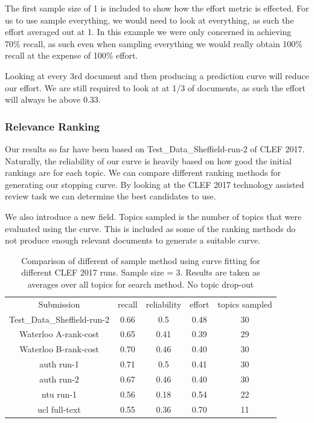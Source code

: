The first sample size of 1 is included to show how the effort metric is effected. For us to use sample everything, we would need to look at everything, as such the effort averaged out at 1. In this example we were only concerned in achieving 70\% recall, as such even when sampling everything we would really obtain 100\% recall at the expense of 100\% effort.

Looking at every 3rd document and then producing a prediction curve will reduce our effort. We are still required to look at at 1/3 of documents, as such the effort will always be above 0.33. 

\subsubsection{Relevance Ranking}

Our results so far have been based on Test\_Data\_Sheffield-run-2 \cite{Alharbi2017} of CLEF 2017. Naturally, the reliability of our curve is heavily based on how good the initial rankings are for each topic. We can compare different ranking methods for generating our stopping curve. By looking at the CLEF 2017 technology assisted review task \cite{Kanoulas12017} we can determine the best candidates to use.

We also introduce a new field. Topics sampled is the number of topics that were evaluated using the curve. This is included as some of the ranking methods do not produce enough relevant documents to generate a suitable curve. 

\begin{table}[H]
\centering
\begin{tabular}{|c|c|c|c|c|} 

 \hline
 Submission & recall & reliability & effort & topics sampled  \\ 
 Test\_Data\_Sheffield-run-2 & 0.66 &	0.5	&	0.48 & 30 \\ 
 Waterloo A-rank-cost & 0.65 & 0.41	&	0.39 & 29 \\ 
 Waterloo B-rank-cost & 0.70 & 0.46	&	0.40 & 30 \\ 
 auth run-1 & 0.71 & 0.5	&	0.41 & 30 \\ 
 auth run-2 & 0.67 & 0.46	&	0.40 & 30 \\ 
 ntu run-1 & 0.56 & 0.18	&	0.54 & 22 \\ 
 ucl full-text & 0.55 & 0.36	&	0.70 & 11 \\ 
 \hline
\end{tabular}
\caption{Comparison of different of sample method using curve fitting for different CLEF 2017 runs. Sample size = 3. Results are taken as averages over all topics for search method. No topic drop-out}

\end{table}


